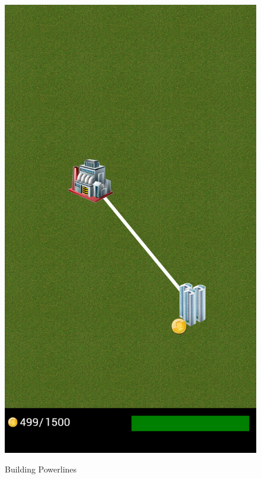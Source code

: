 \begin{figure}[H]
{		\includegraphics[scale=0.17]{pictures/sprint2-screen/sprint2-7}
	}
	\caption{Building Powerlines}
	\end{figure}

